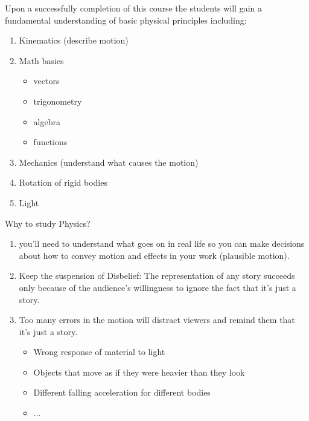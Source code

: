 \documentclass[]{beamer}
\begin{document}
\begin{frame}
  Upon a successfully completion of this course the students will gain a fundamental understanding of basic physical principles including:
  
  \begin{enumerate}
  \item Kinematics (describe motion)
  \pause
  \item Math basics 
  \pause
  \begin{itemize}
  \item vectors
  \item trigonometry
  \item algebra
  \item functions
  \end{itemize}
  \pause
  \item  Mechanics (understand what causes the motion)
  \pause
  \item Rotation of rigid bodies \pause
  \item Light
  \end{enumerate}
  
  
  
   \end{frame}
   
  
  



\begin{frame}

  Why to study Physics?
  
  \begin{enumerate}
   \item you’ll need to understand what goes on in real life so you can make decisions about
  how to convey motion and effects in your work (plausible motion).
  \pause
  \item Keep the suspension of Disbelief: The representation of any story succeeds only because of the
  audience’s willingness to ignore the fact that it’s just a story.
  \pause
  \item Too many errors in the motion will distract viewers and remind them that it’s just a
  story. 
  \pause
  \begin{itemize}
  \item Wrong response of material to light
  \item Objects that move as if they were heavier than they look 
  \item Different falling acceleration for different bodies
  \item ...
  \end{itemize}
  \end{enumerate}
  
  
   \end{frame}
   
\end{document}
